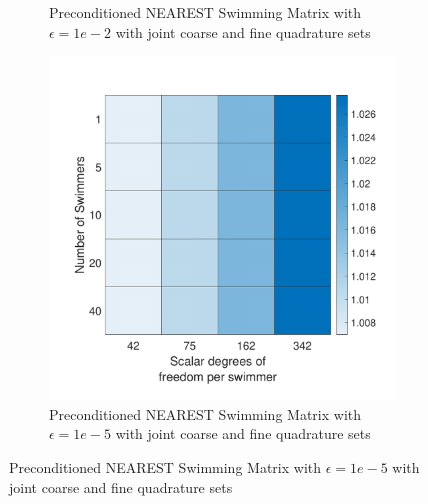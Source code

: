 \begin{figure}
\begin{subfigure}{0.3\textwidth}
        \caption{Preconditioned NEAREST Swimming Matrix with $\epsilon=1e-2$ with joint coarse and fine quadrature sets}  
    \end{subfigure}
    \begin{subfigure}{0.3\textwidth}
        \includegraphics[width=\linewidth]{Images/Condition/Mobility Matrix using Contained NEAREST Preconditioned-5.pdf}
        \caption{Preconditioned NEAREST Swimming Matrix with $\epsilon=1e-5$ with joint coarse and fine quadrature sets}  
    \end{subfigure}
\end{figure}

